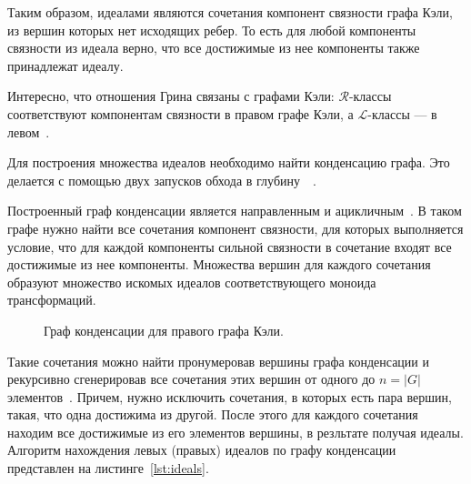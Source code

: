 \documentclass[14pt, russian]{scrartcl}
\begin{document}
Таким образом, идеалами являются сочетания компонент связности графа Кэли, из
вершин которых нет исходящих ребер. То есть для любой компоненты связности из
идеала верно, что все достижимые из нее компоненты также принадлежат идеалу.

Интересно, что отношения Грина связаны с графами Кэли: $\mathcal{R}$-классы
соответствуют компонентам связности в правом графе Кэли, а $\mathcal{L}$-классы
--- в левом~\cite{mathfoundations2025}.

Для построения множества идеалов необходимо найти конденсацию графа. Это
делается с помощью двух запусков обхода в глубину~~\cite{sccs}.

Построенный граф конденсации является направленным и
ацикличным~. В таком графе нужно найти все сочетания
компонент связности, для которых выполняется условие, что для каждой компоненты
сильной связности в сочетание входят все достижимые из нее компоненты. Множества
вершин для каждого сочетания образуют множество искомых идеалов соответствующего
моноида трансформаций.

\begin{figure}[!htb]
  \centering
  \begin{minipage}[t]{\textwidth}
    \centering
    
  \end{minipage}
  \caption{Граф конденсации для правого графа Кэли.}
  \label{fig:condensation}
\end{figure}

Такие сочетания можно найти пронумеровав вершины графа конденсации и рекурсивно
сгенерировав все сочетания этих вершин от одного до $n = |G|$
элементов~\cite{combobjects}. Причем, нужно исключить сочетания, в которых есть
пара вершин, такая, что одна достижима из другой. После этого для каждого
сочетания находим все достижимые из его элементов вершины, в резльтате получая
идеалы. Алгоритм нахождения левых (правых) идеалов по графу конденсации
представлен на листинге~\ref{lst:ideals}.
\end{document}
